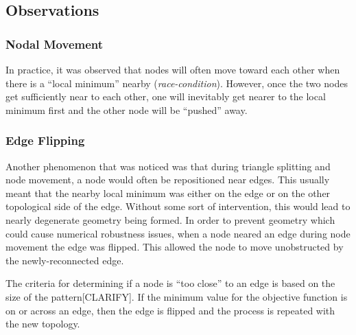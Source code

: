 \subsection{Observations}
\subsubsection{Nodal Movement}
In practice, it was observed that nodes will often move toward each other
when there is a ``local minimum'' nearby ({\it race-condition}).
However, once the two nodes get sufficiently near to each other, one will
inevitably get nearer to the local minimum first and the other node will
be ``pushed'' away.

\subsubsection{Edge Flipping}
Another phenomenon that was noticed was that during triangle splitting
and node movement, a node would often be repositioned near edges. This
usually meant that the nearby local minimum was either on the edge or on 
the other topological side of the edge. Without some sort of intervention,
this would lead to nearly degenerate geometry being formed. In order to
prevent geometry which could cause numerical robustness issues, when a
node neared an edge during node movement the edge was flipped. This
allowed the node to move unobstructed by the newly-reconnected edge.

The criteria for determining if a node is ``too close'' to an edge is
based on the size of the pattern[CLARIFY]. If the minimum value for the
objective function is on or across an edge, then the edge is flipped and
the process is repeated with the new topology.
